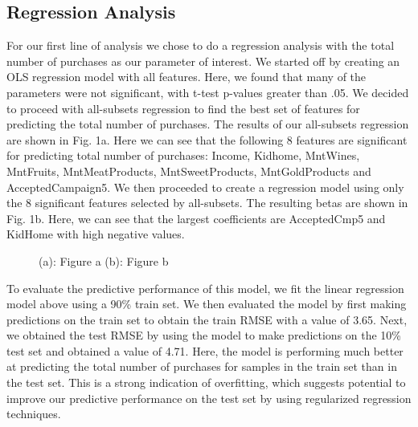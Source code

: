 \documentclass[11pt]{article} %
\begin{document}
\subsection{Regression Analysis}

\quad For our first line of analysis we chose to do a regression analysis with the total number of purchases as our parameter of interest. We started off by creating an OLS regression model with all features. Here, we found that many of the parameters were not significant, with t-test p-values greater than .05. We decided to proceed with all-subsets regression to find the best set of features for predicting the total number of purchases. The results of our all-subsets regression are shown in Fig. 1a. Here we can see that the following 8 features are significant for predicting total number of purchases: Income, Kidhome, MntWines, MntFruits, MntMeatProducts, MntSweetProducts, MntGoldProducts and AcceptedCampaign5. We then proceeded to create a regression model using only the 8 significant features selected by all-subsets. The resulting betas are shown in Fig. 1b. Here, we can see that the largest coefficients are AcceptedCmp5 and KidHome with high negative values.
\begin{figure}[H]
    \centering
    \caption{(a): Figure a (b): Figure b}
    \label{fig:foobar}
\end{figure}

\quad To evaluate the predictive performance of this model, we fit the linear regression model above using a 90\% train set. We then evaluated the model by first making predictions on the train set to obtain the train RMSE with a value of 3.65. Next, we obtained the test RMSE by using the model to make predictions on the 10\% test set and obtained a value of 4.71. Here, the model is performing much better at predicting the total number of purchases for samples in the train set than in the test set. This is a strong indication of overfitting, which suggests potential to improve our predictive performance on the test set by using regularized regression techniques.
\end{document}
